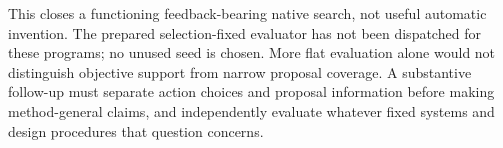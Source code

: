 This closes a functioning feedback-bearing native search, not useful automatic
invention. The prepared selection-fixed evaluator has not been dispatched for
these programs; no unused seed is chosen. More flat evaluation alone would
not distinguish objective support from narrow proposal coverage. A substantive
follow-up must separate action choices and proposal information before making
method-general claims, and independently evaluate whatever fixed systems and
design procedures that question concerns.
\FloatBarrier
